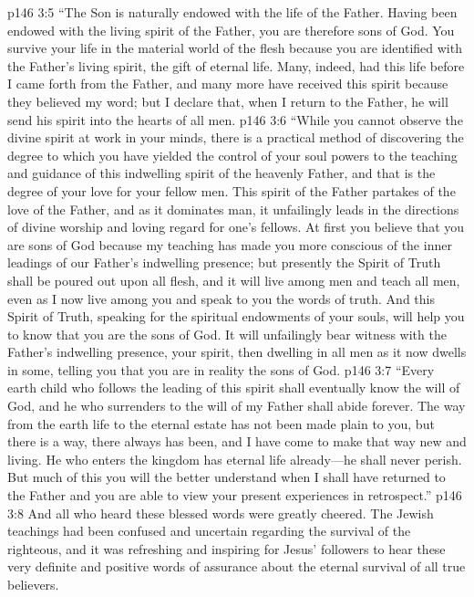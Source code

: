 \vs p146 3:5 \textcolor{ubdarkred}{“The Son is naturally endowed with the life of the Father. Having been endowed with the living spirit of the Father, you are therefore sons of God. You survive your life in the material world of the flesh because you are identified with the Father’s living spirit, the gift of eternal life. Many, indeed, had this life before I came forth from the Father, and many more have received this spirit because they believed my word; but I declare that, when I return to the Father, he will send his spirit into the hearts of all men.}
\vs p146 3:6 \textcolor{ubdarkred}{“While you cannot observe the divine spirit at work in your minds, there is a practical method of discovering the degree to which you have yielded the control of your soul powers to the teaching and guidance of this indwelling spirit of the heavenly Father, and that is the degree of your love for your fellow men. This spirit of the Father partakes of the love of the Father, and as it dominates man, it unfailingly leads in the directions of divine worship and loving regard for one’s fellows. At first you believe that you are sons of God because my teaching has made you more conscious of the inner leadings of our Father’s indwelling presence; but presently the Spirit of Truth shall be poured out upon all flesh, and it will live among men and teach all men, even as I now live among you and speak to you the words of truth. And this Spirit of Truth, speaking for the spiritual endowments of your souls, will help you to know that you are the sons of God. It will unfailingly bear witness with the Father’s indwelling presence, your spirit, then dwelling in all men as it now dwells in some, telling you that you are in reality the sons of God.}
\vs p146 3:7 \textcolor{ubdarkred}{“Every earth child who follows the leading of this spirit shall eventually know the will of God, and he who surrenders to the will of my Father shall abide forever. The way from the earth life to the eternal estate has not been made plain to you, but there is a way, there always has been, and I have come to make that way new and living. He who enters the kingdom has eternal life already---he shall never perish. But much of this you will the better understand when I shall have returned to the Father and you are able to view your present experiences in retrospect.”}
\vs p146 3:8 And all who heard these blessed words were greatly cheered. The Jewish teachings had been confused and uncertain regarding the survival of the righteous, and it was refreshing and inspiring for Jesus’ followers to hear these very definite and positive words of assurance about the eternal survival of all true believers.
